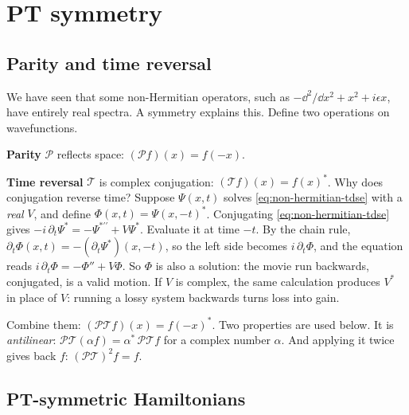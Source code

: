 \section{PT symmetry}\label{sec:non-hermitian-ptsym}

\subsection{Parity and time reversal}

We have seen that some non-Hermitian operators, such as $-\dd^2/\dd x^2+x^2+i\epsilon x$, have entirely real spectra. A symmetry explains this. Define two operations on wavefunctions.

\textbf{Parity} $\mathcal P$ reflects space: $(\mathcal P f)(x)=f(-x)$.

\textbf{Time reversal} $\mathcal T$ is complex conjugation: $(\mathcal T f)(x)=f(x)^*$. Why does conjugation reverse time? Suppose $\Psi(x,t)$ solves \eqref{eq:non-hermitian-tdse} with a \emph{real} $V$, and define $\Phi(x,t)=\Psi(x,-t)^*$. Conjugating \eqref{eq:non-hermitian-tdse} gives $-i\,\partial_t\Psi^* = -\Psi^{*\prime\prime}+V\Psi^*$. Evaluate it at time $-t$. By the chain rule, $\partial_t\Phi(x,t) = -(\partial_t\Psi^*)(x,-t)$, so the left side becomes $i\,\partial_t\Phi$, and the equation reads $i\,\partial_t\Phi=-\Phi''+V\Phi$. So $\Phi$ is also a solution: the movie run backwards, conjugated, is a valid motion. If $V$ is complex, the same calculation produces $V^*$ in place of $V$: running a lossy system backwards turns loss into gain.

Combine them: $(\mathcal{PT}f)(x)=f(-x)^*$. Two properties are used below. It is \emph{antilinear}: $\mathcal{PT}(\alpha f)=\alpha^*\,\mathcal{PT}f$ for a complex number $\alpha$. And applying it twice gives back $f$: $(\mathcal{PT})^2f=f$.

\subsection{PT-symmetric Hamiltonians}

